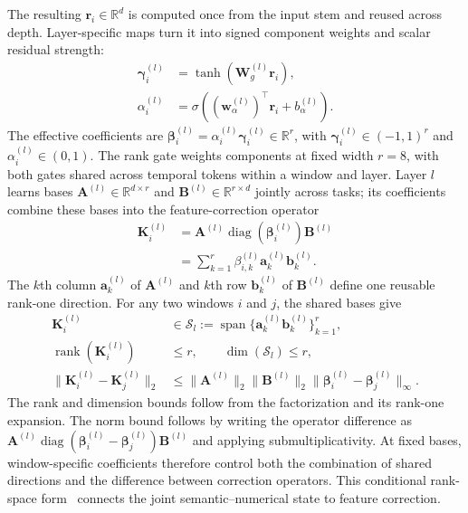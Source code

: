 \documentclass[journal]{IEEEtran}
\begin{document}
The resulting $\mathbf r_i\in\mathbb R^d$ is computed once from the input stem and reused across depth. Layer-specific maps turn it into signed component weights and scalar residual strength:
\begin{equation}
\label{eq:adapter-gates}
\begin{aligned}
\boldsymbol\gamma_i^{(l)}&=\tanh(\mathbf W_g^{(l)}\mathbf r_i),\\
\alpha_i^{(l)}&=\sigma((\mathbf w_\alpha^{(l)})^\top\mathbf r_i+b_\alpha^{(l)}).
\end{aligned}
\end{equation}
The effective coefficients are $\boldsymbol\beta_i^{(l)}=\alpha_i^{(l)}\boldsymbol\gamma_i^{(l)}\in\mathbb R^r$, with $\boldsymbol\gamma_i^{(l)}\in(-1,1)^r$ and $\alpha_i^{(l)}\in(0,1)$. The rank gate weights components at fixed width $r=8$, with both gates shared across temporal tokens within a window and layer. Layer $l$ learns bases $\mathbf A^{(l)}\in\mathbb R^{d\times r}$ and $\mathbf B^{(l)}\in\mathbb R^{r\times d}$ jointly across tasks; its coefficients combine these bases into the feature-correction operator
\begin{equation}
\label{eq:effective-adapter}
\begin{aligned}
\mathbf K_i^{(l)}
&=\mathbf A^{(l)}\operatorname{diag}(\boldsymbol\beta_i^{(l)})\mathbf B^{(l)}\\
&=\sum_{k=1}^{r}\beta_{i,k}^{(l)}\mathbf a_k^{(l)}\mathbf b_k^{(l)}.
\end{aligned}
\end{equation}
The $k$th column $\mathbf a_k^{(l)}$ of $\mathbf A^{(l)}$ and $k$th row $\mathbf b_k^{(l)}$ of $\mathbf B^{(l)}$ define one reusable rank-one direction. For any two windows $i$ and $j$, the shared bases give
\begin{equation}
\label{eq:operator-geometry}
\begin{aligned}
\mathbf K_i^{(l)}&\in\mathcal S_l
:=\operatorname{span}\{\mathbf a_k^{(l)}\mathbf b_k^{(l)}\}_{k=1}^{r},\\
\operatorname{rank}(\mathbf K_i^{(l)})&\leq r,\qquad
\dim(\mathcal S_l)\leq r,\\
\|\mathbf K_i^{(l)}-\mathbf K_j^{(l)}\|_2
&\leq\|\mathbf A^{(l)}\|_2\|\mathbf B^{(l)}\|_2
\|\boldsymbol\beta_i^{(l)}-\boldsymbol\beta_j^{(l)}\|_\infty.
\end{aligned}
\end{equation}
The rank and dimension bounds follow from the factorization and its rank-one expansion. The norm bound follows by writing the operator difference as $\mathbf A^{(l)}\operatorname{diag}(\boldsymbol\beta_i^{(l)}-\boldsymbol\beta_j^{(l)})\mathbf B^{(l)}$ and applying submultiplicativity. At fixed bases, window-specific coefficients therefore control both the combination of shared directions and the difference between correction operators. This conditional rank-space form~\cite{rafiuddin2026ccmlora} connects the joint semantic--numerical state to feature correction.
\end{document}
